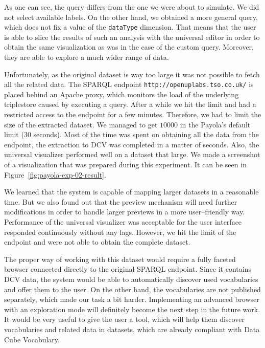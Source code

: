 As one can see, the query differs from the one we were about to simulate. We 
did not select available labels. On the other hand, we obtained a more general 
query, which does not fix a value of the \texttt{dataType} dimension. That means 
that the user is able to slice the results of such an analysis with the universal 
editor in order to obtain the same visualization as was in the case of the custom 
query. Moreover, they are able to explore a much wider range of data.  

Unfortunately, as the original dataset is way too large it was not possible to 
fetch all the related data. The SPARQL endpoint \texttt{http://openuplabs.tso.co.uk/}
is placed behind an Apache proxy, which monitors the load of the underlying 
triplestore caused by executing a query. After a while we hit the limit and had a 
restricted access to the endpoint for a few minutes. Therefore, we had to limit 
the size of the extracted dataset. We managed to get $10000$ in the Payola's 
default limit (30 seconds). Most of the time was spent on obtaining all the 
data from the endpoint, the extraction to DCV was completed in a matter of 
seconds. Also, the universal visualizer performed well on a dataset that large.
We made a screenshot of a visualization that was prepared during this experiment.
It can be seen in Figure~\ref{fig:payola-exp-02-result}.

We learned that the system is capable of mapping larger datasets in a reasonable 
time. But we also found out that the preview mechanism will need further 
modifications in order to handle larger previews in a more user--friendly way. 
Performance of the universal visualizer was acceptable for the user interface 
responded continuously without any lags. However, we hit the limit of the 
endpoint and were not able to obtain the complete dataset. 

The proper way of working with this dataset would require a fully faceted 
browser connected directly to the original SPARQL endpoint. Since it contains 
DCV data, the system would be able to automatically discover used vocabularies 
and offer them to the user. On the other hand, the vocabularies are not published
separately, which made our task a bit harder. Implementing an advanced browser
with an exploration mode will definitely become the next step in the future work. It 
would be very useful to give the user a tool, which will help them 
discover vocabularies and related data in datasets, which are already compliant 
with Data Cube Vocabulary.

